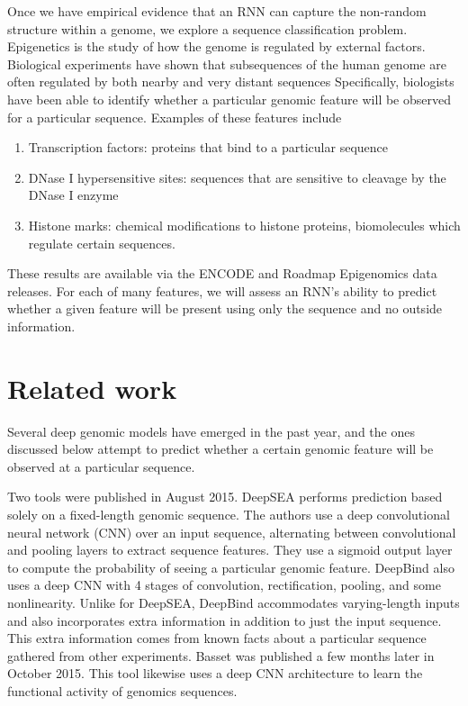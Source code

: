 \documentclass{article} %
\begin{document}
Once we have empirical evidence that an RNN can capture the non-random structure within a genome, we explore a sequence classification problem. Epigenetics is the study of how the genome is regulated by external factors. Biological experiments have shown that subsequences of the human genome are often regulated by both nearby and very distant sequences Specifically, biologists have been able to identify whether a particular genomic feature will be observed for a particular sequence. Examples of these features include
\begin{enumerate}
	\item Transcription factors: proteins that bind to a particular sequence
	\item DNase I hypersensitive sites: sequences that are sensitive to cleavage by the DNase I enzyme
	\item Histone marks: chemical modifications to histone proteins, biomolecules  which regulate certain sequences.
\end{enumerate}

These results are available via the ENCODE \cite{encode2012integrated} and Roadmap Epigenomics \cite{kundaje2015integrative} data releases. For each of many features, we will assess an RNN's ability to predict whether a given feature will be present using only the sequence and no outside information.

\section{Related work}

Several deep genomic models have emerged in the past year, and the ones discussed below attempt to predict whether a certain genomic feature will be observed at a particular sequence.

Two tools were published in August 2015. DeepSEA \cite{zhou2015predicting} performs prediction based solely on a fixed-length genomic sequence. The authors use a deep convolutional neural network (CNN) over an input sequence, alternating between convolutional and pooling layers to extract sequence features. They use a sigmoid output layer to compute the probability of seeing a particular genomic feature. DeepBind \cite{alipanahi2015predicting} also uses a deep CNN with 4 stages of convolution, rectification, pooling, and some nonlinearity. Unlike for DeepSEA, DeepBind accommodates varying-length inputs and also incorporates extra information in addition to just the input sequence. This extra information comes from known facts about a particular sequence gathered from other experiments. Basset \cite{kelley2015basset} was published a few months later in October 2015. This tool likewise uses a deep CNN architecture to learn the functional activity of genomics sequences.
\end{document}
